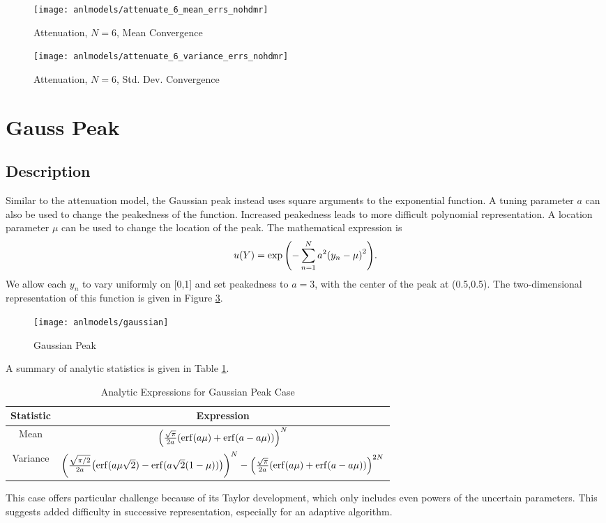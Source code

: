 \begin{figure}[H]
  \centering
  \texttt{[image: anlmodels/attenuate\_6\_mean\_errs\_nohdmr]}
  \caption{Attenuation, $N=6$, Mean Convergence}
  \label{fig:attenuate mean errors 6}
\end{figure}
\begin{figure}[H]
  \centering
  \texttt{[image: anlmodels/attenuate\_6\_variance\_errs\_nohdmr]}
  \caption{Attenuation, $N=6$, Std. Dev. Convergence}
  \label{fig:attenuate var errors 6}
\end{figure}


\section{Gauss Peak}
\subsection{Description}
Similar to the attenuation model, the Gaussian peak \cite{sfugenz} instead uses square arguments to the
exponential function.  A tuning parameter $a$ can also be used to change the peakedness of the
function.  Increased peakedness leads to more difficult polynomial representation.
A location parameter $\mu$ can be used to change the location of the peak.
The mathematical expression is
\begin{equation}
  u(Y) = \exp\qty(-\sum_{n=1}^N a^2\qty(y_n-\mu)^2).
\end{equation}
We allow each $y_n$ to vary uniformly on [0,1] and set peakedness to $a=3$, with the center
of the peak at (0.5,0.5).
The two-dimensional representation of this function is given in Figure \ref{fig: gauss peak}.
\begin{figure}[htb]
  \centering
  \texttt{[image: anlmodels/gaussian]}
  \caption{Gaussian Peak \cite{sfu}}
  \label{fig: gauss peak}
\end{figure}
A summary of analytic statistics is given in Table \ref{tab:gausspeak moments}.

\begin{table}[H]
  \centering
  \begin{tabular}{c|c}
    Statistic & Expression \\ \hline
    Mean & $\qty(\frac{\sqrt{\pi}}{2a}\qty(\erf(a\mu)+\erf(a-a\mu)))^N$ \\
    Variance & $\qty(\frac{\sqrt{\pi/2}}{2a}\qty(\erf(a\mu\sqrt{2})-\erf(a\sqrt{2}(1-\mu))))^N - 
        \qty(\frac{\sqrt{\pi}}{2a}\qty(\erf(a\mu)+\erf(a-a\mu)))^{2N}$
  \end{tabular}
  \caption{Analytic Expressions for Gaussian Peak Case}
  \label{tab:gausspeak moments}
\end{table}
This case offers particular challenge because of its Taylor development, which only includes even powers of
the uncertain parameters.  This suggests added difficulty in successive representation, especially for an
adaptive algorithm.

